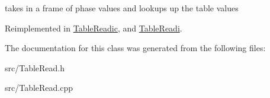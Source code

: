 takes in a frame of phase values and lookups up the table values 

Reimplemented in \hyperlink{class_table_readic_acc300e7cf5cf06af7d4aa06dde917f3c}{Table\+Readic}, and \hyperlink{class_table_readi_a636913b122affaa2b7bde68114f35a4a}{Table\+Readi}.



The documentation for this class was generated from the following files\+:\begin{DoxyCompactItemize}
\item 
src/Table\+Read.\+h\item 
src/Table\+Read.\+cpp\end{DoxyCompactItemize}
